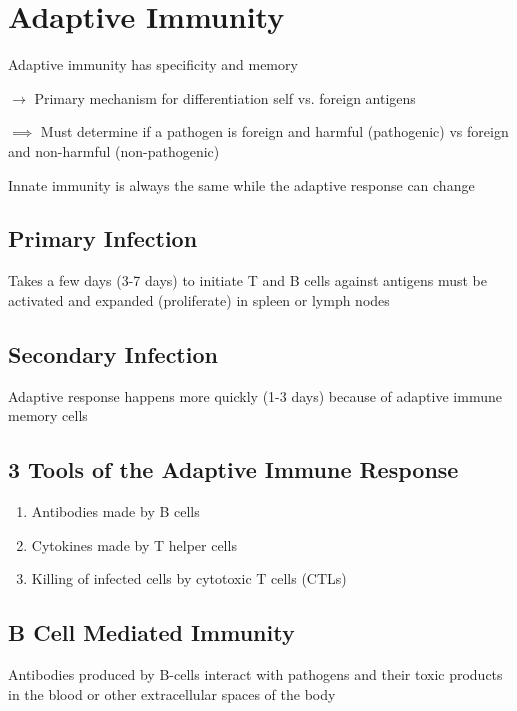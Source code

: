 \documentclass{notes}
\begin{document}
\section{Adaptive Immunity}

Adaptive immunity has specificity and memory

\hspace*{10px} \(\rightarrow\) Primary mechanism for differentiation self vs. foreign antigens

\hspace*{10px} \(\implies\) Must determine if a pathogen is foreign and harmful (pathogenic) vs foreign and non-harmful (non-pathogenic)

Innate immunity is always the same while the adaptive response can change

\subsection*{Primary Infection}

Takes a few days (3-7 days) to initiate
T and B cells against antigens must be activated and expanded (proliferate) in spleen or lymph nodes

\subsection*{Secondary Infection}

Adaptive response happens more quickly (1-3 days) because of adaptive immune memory cells
 
\subsection*{3 Tools of the Adaptive Immune Response}
\begin{enumerate}
    \item Antibodies made by B cells
    \item Cytokines made by T helper cells
    \item Killing of infected cells by cytotoxic T cells (CTLs)
\end{enumerate}

\subsection*{B Cell Mediated Immunity}
Antibodies produced by B-cells interact with pathogens and their toxic products in the blood or other extracellular spaces of the body
\end{document}
